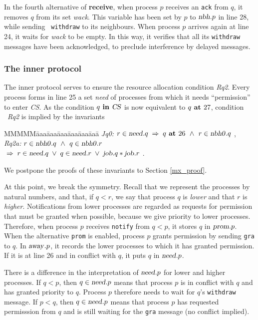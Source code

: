 \documentclass[10pt]{article} \usepackage[english]{babel}
\newenvironment{tab}{\begin{tabbing}
MMMMM\=aaa\=aaa\=aaa\=aaa\=aaa\=aaa\= \kill}{\end{tabbing}}
\def\S #1/{\mbox {\textsl{#1}}}
\def\B #1/{\mbox {\textbf{#1}}}
\def\T #1/{\mbox {\texttt{#1}}}
\def\Implies{\;\Rightarrow\;}
\def\Land   {\mbox{ $\;\land\;$ }}
\def\Lor    {\;\lor\;}
\begin{document}
In the fourth alternative of \B receive/, when process $p$ receives an
\T ack/ from $q$, it removes $q$ from its set \S wack/. This variable
has been set by $p$ to $\S nbh/.p$ in line 28, while sending \T
withdraw/ to its neighbours.  When process $p$ arrives again at line
24, it waits for \S wack/ to be empty. In this way, it verifies that
all its \T withdraw/ messages have been acknowledged, to preclude
interference by delayed messages.

\subsubsection{The inner protocol} \label{inner}

The inner protocol serves to ensure the resource allocation condition
\S Rq2/.  Every process forms in line 25 a set \S need/ of processes
from which it needs ``permission'' to enter \S CS/.  As the condition
$q\B\ in /\S CS/$ is now equivalent to $q\B\ at /27$, condition \S
Rq2/ is implied by the invariants
\begin{tab}
\S Jq0:/ \> $ r\in\S need/.q \Implies q \B\ at / 26 \Land r\in\S nbh0/.q $ ,\\
\S Rq2a:/ \> $ r\in\S nbh0/.q \Land q\in\S nbh0/.r $\\
\> $ \Implies r\in\S need/.q \Lor q\in\S need/.r 
\Lor \S job/.q * \S job/.r $ .
\end{tab}
We postpone the proofs of these invariants to Section \ref{mx_proof}.

At this point, we break the symmetry. Recall that we represent the
processes by natural numbers, and that, if $q<r$, we say that process
$q$ is \emph{lower} and that $r$ is \emph{higher}.  
Notifications from lower processes are regarded as requests for
permission that must be granted when possible, because we give priority
to lower processes. Therefore, when process
$p$ receives \T notify/ from $q < p$, it stores $q$ in $\S prom/.p$.
When the alternative \T prom/ is enabled, process $p$ grants
permission by sending \T gra/ to $q$.  In $\S away/.p$, it records the
lower processes to which it has granted permission. If it is at line
26 and in conflict with $q$, it puts $q$ in $\S need/.p$.

There is a difference in the interpretation of $\S need/.p$ for lower
and higher processes. If $q < p$, then $q\in\S need/.p$ means that
process $p$ is in conflict with $q$ and has granted priority to
$q$. Process $p$ therefore needs to wait for $q$'s \T withdraw/
message. If $p<q$, then $q\in\S need/.p$ means that process $p$ has
requested permisssion from $q$ and is still waiting for the \T gra/
message (no conflict implied).
\end{document}
